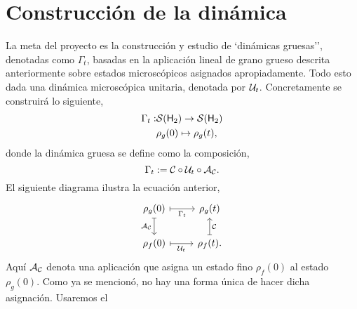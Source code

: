 \section{Construcción de la dinámica}

La meta del proyecto es la construcción y estudio de `dinámicas gruesas'', denotadas como $\Gamma_t$, basadas en la aplicación lineal de grano grueso descrita anteriormente sobre estados microscópicos asignados apropiadamente. Todo esto dada una dinámica microscópica unitaria, denotada por $\mathcal{U}_t$. Concretamente se construirá lo siguiente,
\begin{align*}
\Gamma_{t}:&\mathcal{S}({\sf H}_2)\rightarrow \mathcal{S}({\sf H}_2)\\
&\rho_g(0) \mapsto \rho_g(t),
\end{align*}
donde la dinámica gruesa se define como la composición,
\begin{equation*}
\Gamma_t:=\mathcal{C} \circ \mathcal{U}_t \circ \mathcal{A}_{\mathcal{C}}.
\end{equation*}
El siguiente diagrama ilustra la ecuación anterior,
\[\begin{tikzcd}[arrows={<-|}]
\rho_{g}(0)  & \rho_{g}(t) \arrow{l}{\Gamma_{t}} \arrow{d}{\mcC}\\
\rho_{f}(0) \arrow{u}{\mcA_{\mcC}} & \rho_{f}(t). \arrow{l}{\mcU_{t}}
\end{tikzcd}
\]
Aquí $\mathcal{A}_{\mathcal{C}}$ denota una aplicación que asigna un estado fino $\rho_f(0)$ al estado $\rho_g(0)$. Como ya se mencionó, no hay una forma única de hacer dicha asignación. Usaremos el

